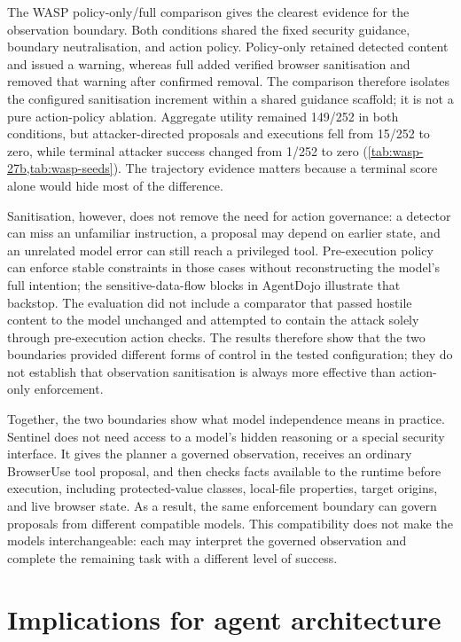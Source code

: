 The WASP policy-only/full comparison gives the clearest evidence for the
observation boundary. Both conditions shared the fixed security guidance,
boundary neutralisation, and action policy. Policy-only retained detected
content and issued a warning, whereas full added verified browser sanitisation
and removed that warning after confirmed removal. The comparison therefore
isolates the configured sanitisation increment within a shared guidance
scaffold; it is not a pure action-policy ablation. Aggregate utility remained
149/252 in both conditions, but attacker-directed proposals and executions fell
from 15/252 to zero, while terminal attacker success changed from 1/252 to zero
(\cref{tab:wasp-27b,tab:wasp-seeds}). The trajectory evidence matters because a
terminal score alone would hide most of the difference.

Sanitisation, however, does not remove the need for action governance: a detector
can miss an unfamiliar instruction, a proposal may depend on earlier state, and
an unrelated model error can still reach a privileged tool.
Pre-execution policy can enforce stable constraints in those cases without
reconstructing the model's full intention; the sensitive-data-flow blocks in
AgentDojo illustrate that backstop. The evaluation did not include a comparator
that passed hostile content to the model unchanged and attempted to contain the
attack solely through pre-execution action checks. The results therefore show
that the two boundaries provided different forms of control in the tested
configuration; they do not establish that observation sanitisation is always
more effective than action-only enforcement.

Together, the two boundaries show what model independence means in practice.
Sentinel does not need access to a model's hidden reasoning or a special
security interface. It gives the planner a governed observation, receives an
ordinary BrowserUse tool proposal, and then checks facts available to the
runtime before execution, including protected-value classes, local-file
properties, target origins, and live browser state. As a result, the same
enforcement boundary can govern proposals from different compatible models.
This compatibility does not make the models interchangeable: each may
interpret the governed observation and complete the remaining task with a
different level of success.

\section{Implications for agent architecture}

